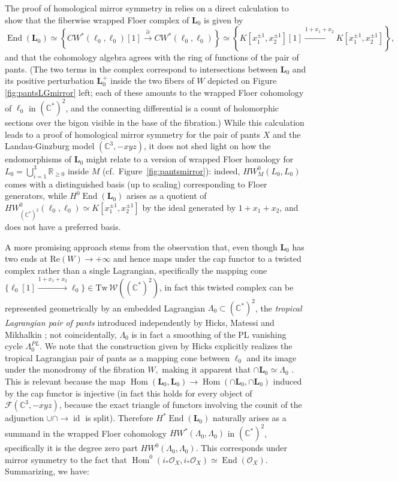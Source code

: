 \documentclass[11pt,leqno]{amsart}
\numberwithin{equation}{section}
\def\R{\mathbb{R}}
\def\C{\mathbb{C}}
\def\Tw{\mathrm{Tw}}
\def\Re{\mathrm{Re}}
\def\F{{\mathcal F}}
\def\O{{\mathcal O}}
\def\W{{\mathcal{W}}}
\def\Hom{\operatorname{Hom}}
\def\End{\operatorname{End}}
\newcommand{\id}{\operatorname{id}}
\begin{document}
The proof of homological mirror symmetry in \cite{AA} relies on a direct calculation to show
that the fiberwise wrapped Floer complex of $\mathbf{L}_0$ is given by
$$\End(\mathbf{L}_0)\simeq
\left\{CW^*(\ell_0,\ell_0)[1] \stackrel{\partial}{\longrightarrow}
CW^*(\ell_0,\ell_0)\right\}\simeq 
\left\{K[x_1^{\pm 1},x_2^{\pm 1}][1]\stackrel{1+x_1+x_2}{\xrightarrow{\hspace{1cm}}}
 K[x_1^{\pm 1},x_2^{\pm 1}]\right\},$$
and that the cohomology algebra agrees with the ring of functions of the pair of pants.
(The two terms in the complex correspond to intersections between $\mathbf{L}_0$ and
its positive perturbation $\mathbf{L}_0^+$ inside the two fibers of $W$ depicted
on Figure \ref{fig:pantsLGmirror} left; each of these amounts to the wrapped
Floer cohomology of $\ell_0$ in $(\C^*)^2$, and the connecting differential is a count
of holomorphic sections over the bigon visible in the base of the fibration.)
While this calculation leads to a proof of homological mirror symmetry 
for the pair of pants $X$ and the Landau-Ginzburg model $(\C^3,-xyz)$, it does
not shed light on how the endomorphisms of $\mathbf{L}_0$
might relate to a version of wrapped Floer homology for $L_0=\bigcup_{i=1}^3 \R_{\geq 0}$
inside $M$ (cf.\ Figure~\ref{fig:pantsmirror}): indeed, $HW^0_M(L_0,L_0)$ comes with a distinguished basis (up to scaling)
corresponding to Floer generators, while $H^0\End(\mathbf{L}_0)$ arises as a
quotient of $HW^0_{(\C^*)^2}(\ell_0,\ell_0)\simeq K[x_1^{\pm 1},x_2^{\pm 1}]$
by the ideal generated by $1+x_1+x_2$, and does not have a preferred basis.

A more promising approach stems from the observation that, even though
$\mathbf{L}_0$ has two ends at $\Re(W)\to +\infty$ and hence maps under
the cap functor to a twisted complex rather than a single
Lagrangian, specifically the mapping cone 
$\bigl\{\ell_0[1]\stackrel{1+x_1+x_2}{\xrightarrow{\hspace{1cm}}}\ell_0\bigr\}
\in \Tw\,\W((\C^*)^2)$, in fact this twisted complex can be represented
geometrically by an embedded Lagrangian $\Lambda_0\subset (\C^*)^2$, the
{\em tropical Lagrangian pair of pants} introduced independently by
Hicks, Matessi and Mikhalkin \cite{Hicks,Matessi,Mikhalkin}; not coincidentally,
$\Lambda_0$ is in fact a smoothing of the PL vanishing cycle $\Lambda_0^{PL}$.
We note that the construction given by Hicks explicitly realizes the tropical Lagrangian
pair of pants as a mapping cone between $\ell_0$ and its image under
the monodromy of the fibration $W,$ making it apparent that
$\cap \mathbf{L}_0\simeq \Lambda_0$ \cite{Hicks}. This is relevant because
the map $\Hom(\mathbf{L}_0,\mathbf{L}_0)\to \Hom(\cap
\mathbf{L}_0,\cap \mathbf{L}_0)$ induced by the cap functor is injective
(in fact this holds for every object of $\F(\C^3,-xyz)$, because the 
exact triangle of functors involving the 
counit of the adjunction $\cup\cap\to \id$ is split). Therefore
$H^*\End(\mathbf{L}_0)$ naturally arises as a summand in the wrapped Floer
cohomology $HW^*(\Lambda_0,\Lambda_0)$ in $(\C^*)^2$, specifically
it is the degree zero part $HW^0(\Lambda_0,\Lambda_0)$. 
This corresponds under mirror symmetry to the fact
that $\Hom^0(i_*\O_X,i_*\O_X)\simeq \End(\O_X)$.
Summarizing, we have:
\end{document}
